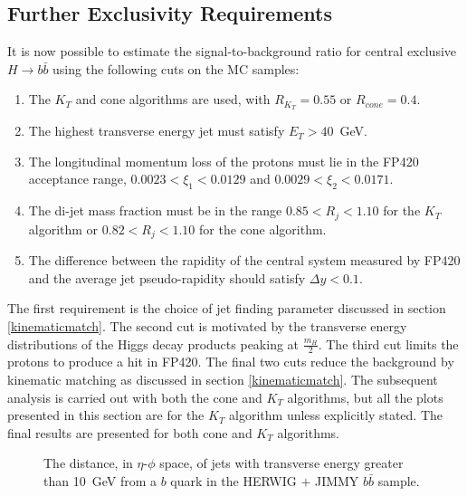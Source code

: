 \subsection{Further Exclusivity Requirements}\label{exclusivityreq}

It is now possible to estimate the signal-to-background ratio for central exclusive $H\rightarrow b\bar{b}$ using the following cuts on the MC samples:
\begin{enumerate}
\item The $K_T$ and cone algorithms are used, with $R_{K_T} = 0.55$ or $R_{cone}=0.4$.
\item The highest transverse energy jet must satisfy $E_T > 40$~GeV.  
\item The longitudinal momentum loss of the protons must lie in the FP420 acceptance range,  $0.0023<\xi_1<0.0129$ and $0.0029<\xi_2<0.0171$.
\item The di-jet mass fraction must be in the range $0.85 < R_j <1.10$ for the $K_T$ algorithm or $0.82< R_j <1.10$ for the cone algorithm.
\item The difference between the rapidity of the central system measured by FP420 and the average jet pseudo-rapidity should satisfy $\Delta y < 0.1$.
\end{enumerate}
The first requirement is the choice of jet finding parameter discussed in section \ref{kinematicmatch}. The second cut is motivated by the transverse energy distributions of the Higgs decay products peaking at $\frac{m_H}{2}$. The third cut limits the protons to produce a hit in FP420. The final two cuts reduce the  background by kinematic matching as discussed in section \ref{kinematicmatch}. The subsequent analysis is carried out with both the cone and $K_T$ algorithms, but all the plots presented in this section are for the $K_T$ algorithm unless explicitly stated. The final results are presented for both cone and $K_T$ algorithms.

\begin{figure}
\centering
\caption[The distance, in $\eta$-$\phi$ space, between the jets and a $b$ quark for a HERWIG $+$ JIMMY $b\bar{b}$ sample]{The distance, in $\eta$-$\phi$ space, of jets with transverse energy greater than 10~GeV from a $b$ quark in the HERWIG $+$ JIMMY $b\bar{b}$ sample.\label{bquarkjets}}
\end{figure}


